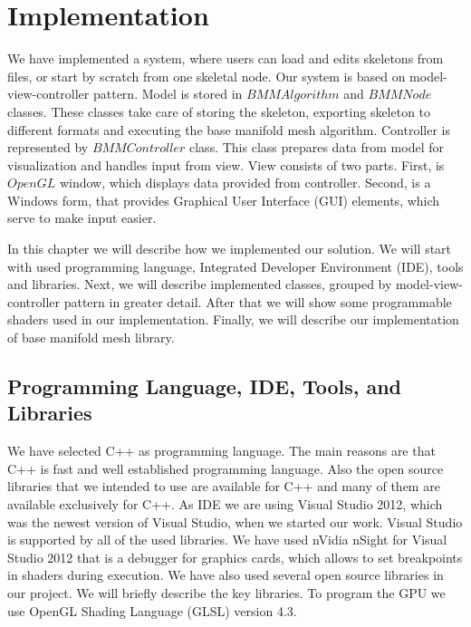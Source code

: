\chapter{Implementation}

We have implemented a system, where users can load and edits skeletons from files, or start by scratch from one skeletal node.
Our system is based on model-view-controller pattern.
Model is stored in $BMMAlgorithm$ and $BMMNode$ classes.
These classes take care of storing the skeleton, exporting skeleton to different formats and executing the base manifold mesh algorithm.
Controller is represented by $BMMController$ class.
This class prepares data from model for visualization and handles input from view.
View consists of two parts.
First, is $OpenGL$ window, which displays data provided from controller.
Second, is a Windows form, that provides Graphical User Interface (GUI) elements, which serve to make input easier.

In this chapter we will describe how we implemented our solution.
We will start with used programming language, Integrated Developer Environment (IDE), tools and libraries.
Next, we will describe implemented classes, grouped by model-view-controller pattern in greater detail.
After that we will show some programmable shaders used in our implementation.
Finally, we will describe our implementation of base manifold mesh library.

\section{Programming Language, IDE, Tools, and Libraries}

We have selected C++ as programming language.
The main reasons are that C++ is fast and well established programming language.
Also the open source libraries that we intended to use are available for C++ and many of them are available exclusively for C++.
As IDE we are using Visual Studio 2012, which was the newest version of Visual Studio, when we started our work.
Visual Studio is supported by all of the used libraries.
We have used nVidia nSight for Visual Studio 2012 that is a debugger for graphics cards, which allows to set breakpoints in shaders during execution. We have also used several open source libraries in our project. We will briefly describe the key libraries.
To program the GPU we use OpenGL Shading Language (GLSL) version 4.3.

